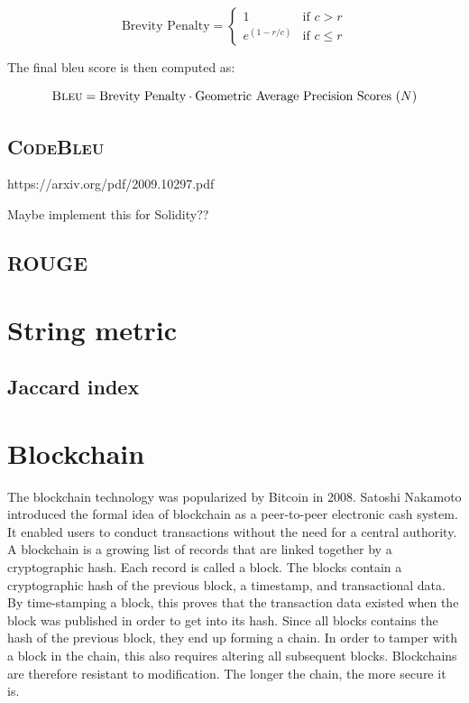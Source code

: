 \begin{equation}
    \label{eqn:brevity-penalty}
    \text{Brevity Penalty} = 
    \begin{cases}
        1 & \text{if } c > r\\
        e^{\left(1-r/c \right)} & \text{if } c \le r
    \end{cases}
\end{equation}

\noindent The final \acrshort{bleu} score is then computed as:

\begin{equation}
    \label{eqn:bleu}
    \textsc{Bleu} = \text{Brevity Penalty} \cdot \text{Geometric Average Precision Scores $\left(N\right)$}
\end{equation}



\subsection{\textsc{CodeBleu}}
\label{sec:code-bleu}
https://arxiv.org/pdf/2009.10297.pdf

Maybe implement this for Solidity??


\subsection{\textsc{ROUGE}}
\label{sec:rouge-score}

\section{String metric}
\label{sec:string-metric}

\subsection{Jaccard index}
\label{sec:jaccard-index}

\section{Blockchain}
\label{sec:blockchain}
The blockchain technology was popularized by Bitcoin in 2008. Satoshi Nakamoto introduced the formal idea of blockchain as a peer-to-peer electronic cash system. It enabled users to conduct transactions without the need for a central authority. A blockchain is a growing list of records that are linked together by a cryptographic hash. Each record is called a block. The blocks contain a cryptographic hash of the previous block, a timestamp, and transactional data. By time-stamping a block, this proves that the transaction data existed when the block was published in order to get into its hash. Since all blocks contains the hash of the previous block, they end up forming a chain. In order to tamper with a block in the chain, this also requires altering all subsequent blocks. Blockchains are therefore resistant to modification. The longer the chain, the more secure it is.

